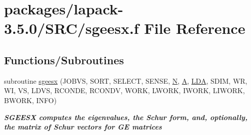\hypertarget{sgeesx_8f}{}\section{packages/lapack-\/3.5.0/\+S\+R\+C/sgeesx.f File Reference}
\label{sgeesx_8f}
\subsection*{Functions/\+Subroutines}
\begin{DoxyCompactItemize}
\item 
subroutine \hyperlink{group__realGEeigen_gac8e46bbcd7e259cdacfccbcfb575a392}{sgeesx} (J\+O\+B\+V\+S, S\+O\+R\+T, S\+E\+L\+E\+C\+T, S\+E\+N\+S\+E, \hyperlink{polmisc_8c_a0240ac851181b84ac374872dc5434ee4}{N}, \hyperlink{classA}{A}, \hyperlink{example__user_8c_ae946da542ce0db94dced19b2ecefd1aa}{L\+D\+A}, S\+D\+I\+M, W\+R, W\+I, V\+S, L\+D\+V\+S, R\+C\+O\+N\+D\+E, R\+C\+O\+N\+D\+V, W\+O\+R\+K, L\+W\+O\+R\+K, I\+W\+O\+R\+K, L\+I\+W\+O\+R\+K, B\+W\+O\+R\+K, I\+N\+F\+O)
\begin{DoxyCompactList}\small\item\em {\bfseries  S\+G\+E\+E\+S\+X computes the eigenvalues, the Schur form, and, optionally, the matrix of Schur vectors for G\+E matrices} \end{DoxyCompactList}\end{DoxyCompactItemize}
